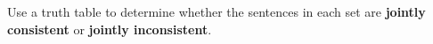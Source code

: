 \begin{small}
\begin{earg}
\end{earg}




\problempart \label{pr.TT.consistent} Use a truth table to determine whether the sentences in each set are \textbf{jointly consistent} or \textbf{jointly inconsistent}.

\begin{earg}

\end{earg}
\end{small}
